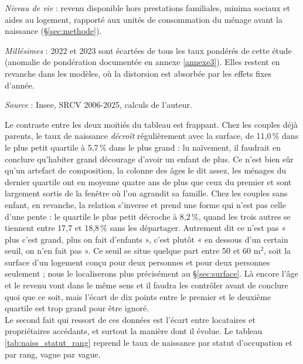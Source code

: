 \documentclass[12pt,a4paper]{article}
\begin{document}
\begin{table}[htbp]
\begin{threeparttable}
\begin{tablenotes}[flushleft]
			\item \textit{Niveau de vie} : revenu disponible hors prestations familiales, minima sociaux
			et aides au logement, rapporté aux unités de consommation du ménage avant la naissance
			(§\ref{sec:methode}).
			\item \textit{Millésimes} : 2022 et 2023 sont écartées de tous les taux pondérés de
			cette étude (anomalie de pondération documentée en annexe \ref{annexe3}). Elles restent
			en revanche dans les modèles, où la distorsion est absorbée par les effets fixes d'année.
			\item \textit{Source} : Insee, SRCV 2006-2025, calculs de l'auteur.
		\end{tablenotes}
	\end{threeparttable}
\end{table}

\bigskip

\noindent Le contraste entre les deux moitiés du tableau est frappant. Chez les couples déjà parents, le taux de naissance \textit{décroît} régulièrement avec la surface, de 11,0\,\% dans le plus petit quartile à 5,7\,\% dans le plus grand : lu naïvement, il faudrait en conclure qu'habiter grand décourage d'avoir un enfant de plus. Ce n'est bien sûr qu'un artefact de composition, la colonne des âges le dit assez, les ménages du dernier quartile ont en moyenne quatre ans de plus que ceux du premier et sont largement sortis de la fenêtre où l'on agrandit sa famille. Chez les couples sans enfant, en revanche, la relation s'inverse et prend une forme qui n'est pas celle d'une pente : le quartile le plus petit décroche à 8,2\,\%, quand les trois autres se tiennent entre 17,7 et 18,8\,\% sans les départager. Autrement dit ce n'est pas « plus c'est grand, plus on fait d'enfants », c'est plutôt « en dessous d'un certain seuil, on n'en fait pas ». Ce seuil se situe quelque part entre 50 et 60 m$^2$, soit la surface d'un logement conçu pour deux personnes et pour deux personnes seulement ; nous le localiserons plus précisément au §\ref{sec:surface}. Là encore l'âge et le revenu vont dans le même sens et il faudra les contrôler avant de conclure quoi que ce soit, mais l'écart de dix points entre le premier et le deuxième quartile est trop grand pour être ignoré. \\

\noindent Le second fait qui ressort de ces données est l'écart entre locataires et propriétaires accédants, et surtout la manière dont il évolue. Le tableau \ref{tab:naiss_statut_rang} reprend le taux de naissance par statut d'occupation et par rang, vague par vague. \\
\end{document}
